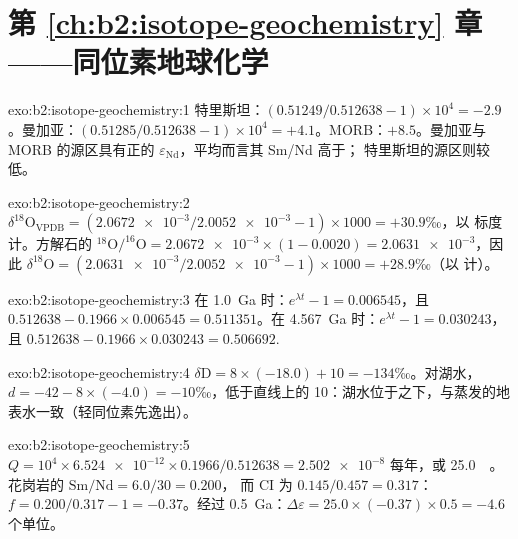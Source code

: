 \section*{第 \ref{ch:b2:isotope-geochemistry} 章——同位素地球化学}

\begin{solution}{exo:b2:isotope-geochemistry:1}
特里斯坦：$(0.51249/0.512638 - 1)\times10^4 = -2.9$。曼加亚：$(0.51285/0.512638 -
1)\times10^4 = +4.1$。MORB：$+8.5$。曼加亚与 MORB 的源区具有正的
$\varepsilon_{\mathrm{Nd}}$，平均而言其 Sm/Nd 高于；
特里斯坦的源区则较低。
\end{solution}

\begin{solution}{exo:b2:isotope-geochemistry:2}
$\delta^{18}\mathrm{O}_{\mathrm{VPDB}} = (\num{2.0672e-3}/\num{2.0052e-3} - 1)\times1000 =
+30.9$‰，以  标度计。方解石的 $^{18}\mathrm{O}/^{16}\mathrm{O} =
\num{2.0672e-3}\times(1 - 0.0020) = \num{2.0631e-3}$，因此 $\delta^{18}\mathrm{O} =
(\num{2.0631e-3}/\num{2.0052e-3} - 1)\times1000 = +28.9$‰（以  计）。
\end{solution}

\begin{solution}{exo:b2:isotope-geochemistry:3}
在 \qty{1.0}{Ga} 时：$e^{\lambda t} - 1 = 0.006545$，且 $0.512638 - 0.1966\times0.006545 =
0.511351$。在 \qty{4.567}{Ga} 时：$e^{\lambda t}-1 = 0.030243$，且 $0.512638 -
0.1966\times0.030243 = 0.506692$.
\end{solution}

\begin{solution}{exo:b2:isotope-geochemistry:4}
$\delta\mathrm{D} = 8\times(-18.0) + 10 = -134$‰。对湖水，$d = -42 -
8\times(-4.0) = -10$‰，低于直线上的 10：湖水位于之下，与蒸发的地表水一致（轻同位素先逸出）。
\end{solution}

\begin{solution}{exo:b2:isotope-geochemistry:5}
$Q = 10^4\times\num{6.524e-12}\times0.1966/0.512638 = \num{2.502e-8}$ 每年，或
\qty{25.0}{\per\Ga}。花岗岩的 $\mathrm{Sm}/\mathrm{Nd} = 6.0/30 = 0.200$，
而 CI 为 $0.145/0.457 = 0.317$：$f = 0.200/0.317 - 1 = -0.37$。经过
\qty{0.5}{Ga}：$\Delta\varepsilon = 25.0\times(-0.37)\times0.5 = -4.6$ 个单位。
\end{solution}

